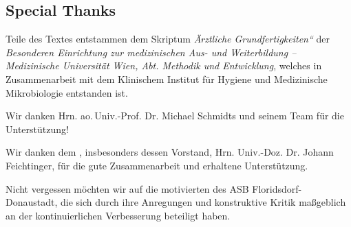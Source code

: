 \subsection*{Special Thanks}


\noindent{}Teile des Textes entstammen dem Skriptum
\emph{{\quotedblbase}Ärztliche
Grundfertigkeiten{\textquotedblleft}} der \emph{Besonderen
Einrichtung zur medizinischen Aus- und Weiterbildung --
Medizinische Universität Wien, Abt. Methodik und Entwicklung}, welches in Zusammenarbeit  mit dem Klinischem Institut für Hygiene und
Medizinische Mikrobiologie entstanden ist.

\vspace{1em}

\noindent{}Wir danken Hrn. ao.\,Univ.-Prof. Dr. Michael
Schmidts und seinem Team für die Unterstützung!

\vspace{1em}

\noindent{}Wir danken dem , insbesonders dessen Vorstand,
Hrn. Univ.-Doz. Dr. Johann Feichtinger, für die gute
Zusammenarbeit und erhaltene Unterstützung.

\vspace{1em}

\noindent{}Nicht vergessen möchten wir auf die motivierten
 des ASB Florids\-dorf-Donau\-stadt, die sich durch ihre Anregungen und konstruktive
Kritik maßgeblich an der kontinuierlichen Verbesserung beteiligt haben.


